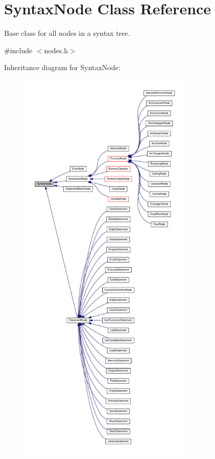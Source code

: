 \hypertarget{classSyntaxNode}{}\section{Syntax\+Node Class Reference}
\label{classSyntaxNode}


Base class for all nodes in a syntax tree.  




{\ttfamily \#include $<$nodes.\+h$>$}



Inheritance diagram for Syntax\+Node\+:
\nopagebreak
\begin{figure}[H]
\begin{center}
\leavevmode
\includegraphics[height=550pt]{dc/dce/classSyntaxNode__inherit__graph}
\end{center}
\end{figure}


